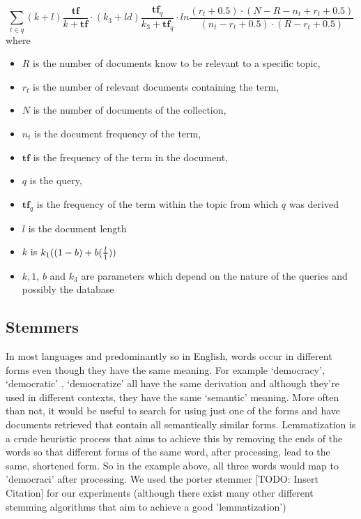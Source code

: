 \begin{equation}
 \sum\limits_{t \in q} (k+l)\frac{\bm{tf}}{k+\bm{tf}} \cdot (k_3+ld) \frac{\bm{tf}_q}{k_3 + \bm{tf}_q} \cdot ln\frac{ (r_t +0.5) \cdot (N-R-n_t+r_t+0.5) }{(n_t-r_t+0.5) \cdot (R-r_t+0.5)}
\end{equation}
where
\begin{itemize}
\item $R$ is the number of documents know to be relevant to a specific topic,
\item $r_t$ is the number of relevant documents containing the term,
\item $N$ is the number of documents of the collection, 
\item $n_t$ is the document frequency of the term,
\item $\bm{tf}$ is the frequency of the term in the document,
\item $q$ is the query,
\item $\bm{tf}_q$ is the frequency of the term within the topic from which $q$ was derived
\item $l$ is the document length
\item $k$ is $k_1( ( 1-b ) + b( \Tfrac{l}{1} ) )$
\item $k,1$, $b$ and $k_3$ are parameters which depend on the nature of the queries and possibly the database

\end{itemize}

\subsection{Stemmers}

In most languages and predominantly so in English, words occur in different forms even though they have the same meaning. For example \lq democracy', \lq democratic' , \lq democratize' all have the same derivation and although they're used in different contexts, they have the same \lq semantic' meaning. More often than not, it would be useful to search for using just one of the forms and have documents retrieved that contain all semantically similar forms. Lemmatization is a crude heuristic process that aims to achieve this by removing the ends of the words so that different forms of the same word, after processing, lead to the same, shortened form. So in the example above, all three words would map to ’democraci’ after processing. We used the porter stemmer [TODO: Insert Citation] for our experiments (although there exist many other different stemming algorithms that aim to achieve a good ’lemmatization’)

